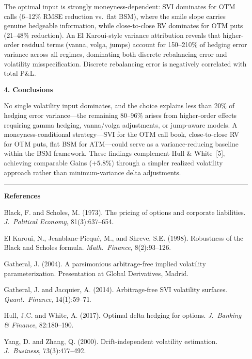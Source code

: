 \documentclass[10pt, twocolumn, letterpaper]{article}
\begin{document}
The optimal input is strongly moneyness-dependent: SVI dominates for OTM calls (6--12\% RMSE reduction vs.\ flat BSM), where the smile slope carries genuine hedgeable information, while close-to-close RV dominates for OTM puts (21--48\% reduction). An El Karoui-style variance attribution reveals that higher-order residual terms (vanna, volga, jumps) account for 150--210\% of hedging error variance across all regimes, dominating both discrete rebalancing error and volatility misspecification. Discrete rebalancing error is negatively correlated with total P\&L.

\textbf{4. Conclusions}

No single volatility input dominates, and the choice explains less than 20\% of hedging error variance---the remaining 80--96\% arises from higher-order effects requiring gamma hedging, vanna/volga adjustments, or jump-aware models. A moneyness-conditional strategy---SVI for the OTM call book, close-to-close RV for OTM puts, flat BSM for ATM---could serve as a variance-reducing baseline within the BSM framework. These findings complement Hull \& White~[5], achieving comparable Gains ($+5.8\%$) through a simpler realized volatility approach rather than minimum-variance delta adjustments.

\vspace{0.5em}
\hrule
\vspace{0.3em}

{\footnotesize
\noindent\textbf{References}

\noindent [1] Black, F. and Scholes, M. (1973). The pricing of options and corporate liabilities. \textit{J.~Political Economy}, 81(3):637--654.

\noindent [2] El Karoui, N., Jeanblanc-Picqu\'{e}, M., and Shreve, S.E. (1998). Robustness of the Black and Scholes formula. \textit{Math.~Finance}, 8(2):93--126.

\noindent [3] Gatheral, J. (2004). A parsimonious arbitrage-free implied volatility parameterization. Presentation at Global Derivatives, Madrid.

\noindent [4] Gatheral, J. and Jacquier, A. (2014). Arbitrage-free SVI volatility surfaces. \textit{Quant.~Finance}, 14(1):59--71.

\noindent [5] Hull, J.C. and White, A. (2017). Optimal delta hedging for options. \textit{J.~Banking \& Finance}, 82:180--190.

\noindent [6] Yang, D. and Zhang, Q. (2000). Drift-independent volatility estimation. \textit{J.~Business}, 73(3):477--492.
}
\end{document}
